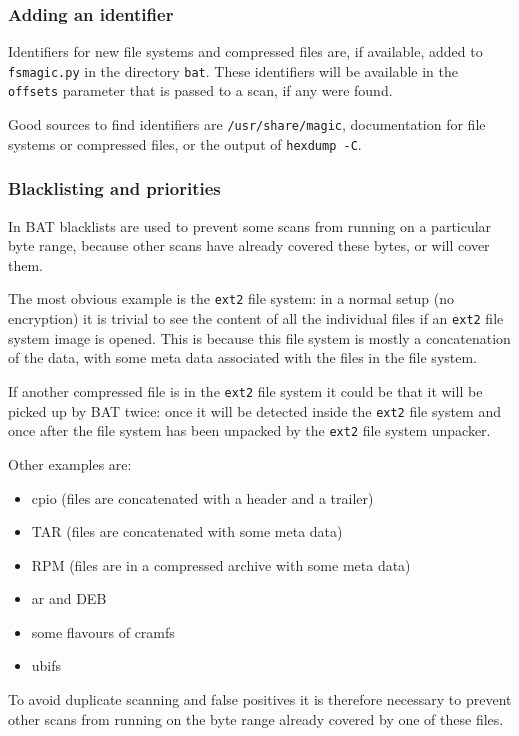 \documentclass[10pt]{article}
\begin{document}
\subsubsection{Adding an identifier}

Identifiers for new file systems and compressed files are, if available, added
to \texttt{fsmagic.py} in the directory \texttt{bat}. These identifiers will be
available in the \texttt{offsets} parameter that is passed to a scan, if any
were found.

Good sources to find identifiers are \texttt{/usr/share/magic}, documentation
for file systems or compressed files, or the output of \texttt{hexdump -C}.

\subsubsection{Blacklisting and priorities}

In BAT blacklists are used to prevent some scans from running on a particular
byte range, because other scans have already covered these bytes, or will cover
them.

The most obvious example is the \texttt{ext2} file system: in a normal setup
(no encryption) it is trivial to see the content of all the individual files
if an \texttt{ext2} file system image is opened. This is because this file
system is mostly a concatenation of the data, with some meta data associated
with the files in the file system.

If another compressed file is in the \texttt{ext2} file system it could be that
it will be picked up by BAT twice: once it will be detected inside the
\texttt{ext2} file system and once after the file system has been unpacked by
the \texttt{ext2} file system unpacker.

Other examples are:

\begin{itemize}
\item cpio (files are concatenated with a header and a trailer)
\item TAR (files are concatenated with some meta data)
\item RPM (files are in a compressed archive with some meta data)
\item ar and DEB
\item some flavours of cramfs
\item ubifs
\end{itemize}

To avoid duplicate scanning and false positives it is therefore necessary to
prevent other scans from running on the byte range already covered by one of
these files.
\end{document}
